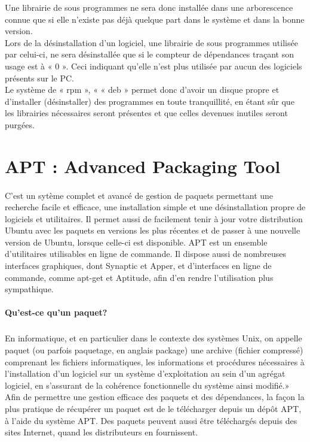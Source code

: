 \documentclass[a4paper,12pt]{article}
\begin{document}
Une librairie de sous programmes ne sera donc installée dans une arborescence connue que si elle n’existe pas déjà quelque part dans le système et dans la bonne version.\\

Lors de la désinstallation d’un logiciel, une librairie de sous programmes utilisée par celui-ci, ne sera désinstallée que si le compteur de 
dépendances traçant son usage est à « 0 ». Ceci indiquant qu’elle n’est plus utilisée par aucun des logiciels présents sur le PC.\\

Le système de « rpm », « « deb » permet donc d’avoir un disque propre et d’installer (désinstaller) des programmes en toute tranquillité, 
en étant sûr que les librairies nécessaires seront présentes et que celles devenues inutiles seront purgées.
\clearpage

\section{APT : Advanced Packaging Tool}
\paragraph{}
C'est un sytème complet et avancé de gestion de paquets permettant une recherche facile et efficace, une installation simple et une désinstallation propre de logiciels et utilitaires. 
Il permet aussi de facilement tenir à jour votre distribution Ubuntu avec les paquets en versions les plus récentes et de passer à une nouvelle version de Ubuntu, lorsque celle-ci est disponible.
APT est un ensemble d'utilitaires utilisables en ligne de commande. Il dispose aussi de nombreuses interfaces graphiques, dont Synaptic et Apper, et d'interfaces en ligne de commande, comme apt-get 
et Aptitude, afin d'en rendre l'utilisation plus sympathique.

\paragraph{Qu'est-ce qu'un paquet?}
\subparagraph{}
En informatique, et en particulier dans le contexte des systèmes Unix, on appelle paquet (ou parfois paquetage, en anglais package) une archive (fichier compressé) comprenant les fichiers informatiques, 
les informations et procédures nécessaires à l'installation d'un logiciel sur un système d'exploitation au sein d'un agrégat logiciel, en s'assurant de la cohérence fonctionnelle du système ainsi modifié.» 	
Afin de permettre une gestion efficace des paquets et des dépendances, la façon la plus pratique de récupérer un paquet est de le télécharger depuis un dépôt APT, à l'aide du système APT. Des paquets 
peuvent aussi être téléchargés depuis des sites Internet, quand les distributeurs en fournissent.
\end{document}
